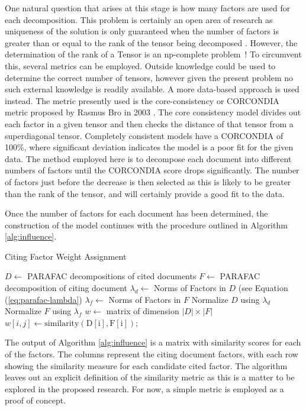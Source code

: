 \documentclass{article}
\begin{document}
One natural question that arises at this stage is how many factors are
used for each decomposition. This problem is certainly an open area of
research as uniqueness of the solution is only guaranteed when the
number of factors is greater than or equal to the rank of the tensor
being decomposed \cite{harshman1970}.  However, the determination of
the rank of a Tensor is an np-complete problem~\cite{haastad1990}!  To
circumvent this, several metrics can be employed.  Outside knowledge
could be used to determine the correct number of tensors, however
given the present problem no such external knowledge is readily
available.  A more data-based approach is used instead.  The metric
presently used is the core-consistency or CORCONDIA metric proposed by
Rasmus Bro in 2003 \cite{bro2003}.  The core consistency model divides
out each factor in a given tensor and then checks the distance of that
tensor from a superdiagonal tensor.  Completely consistent models have
a CORCONDIA of 100\%, where significant deviation indicates the model
is a poor fit for the given data.  The method employed here is to
decompose each document into different numbers of factors until the
CORCONDIA score drops significantly.  The number of factors just
before the decrease is then selected as this is likely to be greater
than the rank of the tensor, and will certainly provide a good fit to
the data.

Once the number of factors for each document has been determined, the
construction of the model continues with the procedure outlined in
Algorithm \ref{alg:influence}.  

\begin{algorithm}
    \caption{Citing Factor Weight Assignment}
    \label{alg:influence}
    $D \leftarrow$ PARAFAC decompositions of cited documents\;
    $F \leftarrow$ PARAFAC decomposition of citing document\;
    $\lambda_d \leftarrow $ Norms of Factors in $D$ (see Equation
    (\ref{eq:parafac-lambda})\;
    $\lambda_f \leftarrow $ Norms of Factors in $F$\;
    Normalize $D$ using $\lambda_d$\;
    Normalize $F$ using $\lambda_f$\;
    $w \leftarrow $ matrix of dimension $|D| \times |F|$\;
     {
         {
            $w[i,j] \leftarrow \mathrm{similarity(D[i], F[i])}$;
        }
    }
\end{algorithm}

The output of Algorithm \ref{alg:influence} is a matrix with similarity
scores for each of the factors. The columns represent the citing
document factors, with each row showing the similarity measure for
each candidate cited factor.  The algorithm leaves out an explicit
definition of the similarity metric as this is a matter to be explored
in the proposed research. For now, a simple metric is employed as
a proof of concept.  
\end{document}
